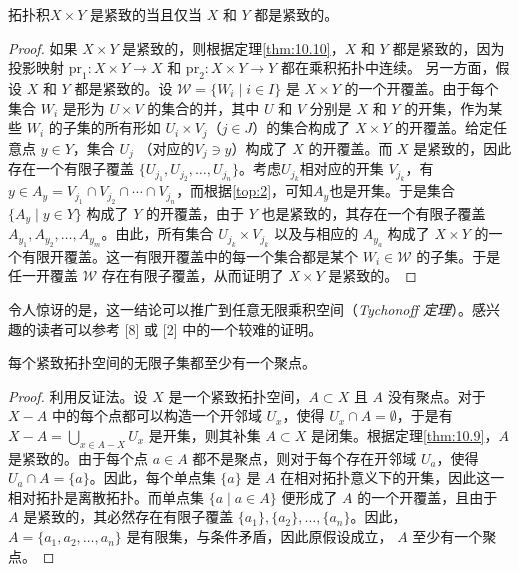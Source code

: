 \begin{theorem}\label{thm:10.11} 
	拓扑积$X\times Y$ 是紧致的当且仅当 $X$ 和 $Y$ 都是紧致的。
\end{theorem}

\begin{proof}
	如果 $X\times Y$ 是紧致的，则根据定理\ref{thm:10.10}，$X$ 和 $Y$ 都是紧致的，因为投影映射 $\mathrm{pr}_{1} :X\times Y\rightarrow X$ 和 $\mathrm{pr}_{2} :X\times Y\rightarrow Y$  都在乘积拓扑中连续。
	另一方面，假设 $X$ 和 $Y$ 都是紧致的。设 $\mathcal{W} =\{W_{i} \mid i\in I\}$ 是 $X\times Y$ 的一个开覆盖。由于每个集合 $W_{i}$ 是形为 $U\times V$ 的集合的并，其中 $U$ 和 $V$ 分别是 $X$ 和 $Y$ 的开集，作为某些 $W_{i}$ 的子集的所有形如 $U_{i} \times V_{j}$（$j\in J$）的集合构成了 $X\times Y$ 的开覆盖。给定任意点 $y\in Y$，集合 $U_{j}$ （对应的$V_{j} \ni y$）构成了 $X$ 的开覆盖。而 $X$ 是紧致的，因此存在一个有限子覆盖 $\{U_{j_{1}} ,U_{j_{2}} ,\dotsc ,U_{j_{n}} \}$。考虑$U_{j_{k}}$相对应的开集 $V_{j_{k}}$，有$y\in A_{y} =V_{j_{1}} \cap V_{j_{2}} \cap \cdots \cap V_{j_{n}}$，而根据\ref{top:2}，可知$A_{y}$也是开集。于是集合 $\{A_{y} \mid y\in Y\}$ 构成了 $Y$ 的开覆盖，由于 $Y$ 也是紧致的，其存在一个有限子覆盖 $A_{y_{1}} ,A_{y_{2}} ,\dotsc ,A_{y_{m}}$。由此，所有集合 $U_{j_{k}} \times V_{j_{k}}$ 以及与相应的 $A_{y_{a}}$ 构成了 $X\times Y$ 的一个有限开覆盖。这一有限开覆盖中的每一个集合都是某个 $W_{i} \in \mathcal{W}$ 的子集。于是任一开覆盖 $\mathcal{W}$ 存在有限子覆盖，从而证明了 $X\times Y$ 是紧致的。
\end{proof}

	令人惊讶的是，这一结论可以推广到任意无限乘积空间（\emph{Tychonoff 定理}）。感兴趣的读者可以参考 [8] 或 [2] 中的一个较难的证明。

\begin{theorem}\label{thm:10.12} 
	每个紧致拓扑空间的无限子集都至少有一个聚点。
\end{theorem}

\begin{proof}
	利用反证法。设 $X$ 是一个紧致拓扑空间，$A\subset X$ 且 $A$ 没有聚点。对于 $X-A$ 中的每个点都可以构造一个开邻域 $U_{x}$，使得 $U_{x} \cap A=\emptyset $，于是有$X-A=\bigcup _{x\in A-X} U_{x}$ 是开集，则其补集 $A\subset X$ 是闭集。根据定理\ref{thm:10.9}，$A$ 是紧致的。由于每个点 $a\in A$ 都不是聚点，则对于每个存在开邻域 $U_{a}$，使得 $U_{a} \cap A=\{a\}$。因此，每个单点集 $\{a\}$ 是 $A$ 在相对拓扑意义下的开集，因此这一相对拓扑是离散拓扑。而单点集 $\{a\mid a\in A\}$ 便形成了 $A$ 的一个开覆盖，且由于 $A$ 是紧致的，其必然存在有限子覆盖 $\{a_{1} \},\{a_{2} \},\dotsc ,\{a_{n} \}$。因此，$A=\{a_{1} ,a_{2} ,\dotsc ,a_{n} \}$ 是有限集，与条件矛盾，因此原假设成立， $A$ 至少有一个聚点。
\end{proof}

